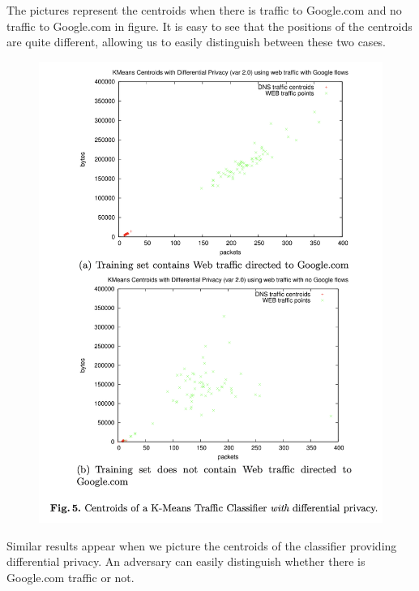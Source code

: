 \documentclass[11pt]{article}
\numberwithin{equation}{section}
\begin{document}
 The pictures represent the centroids when there is traffic to Google.com and no traffic to Google.com in figure. It is easy to see that the positions of the centroids are quite different, allowing us to easily distinguish between these two cases.

\begin{figure}[H]
    \centering
    \includegraphics[width = 14cm]{figures/google_diff.png}
    \label{fig:my_label}
\end{figure}
Similar results appear when we picture the centroids of the classifier providing differential privacy. An adversary can easily distinguish whether there is Google.com traffic or not.


% 

% 
\end{document}
